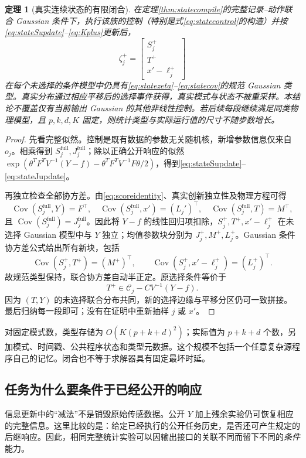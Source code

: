 \documentclass[UTF8,fontset=fandol,zihao=5,a4paper]{ctexart}
\DeclareMathOperator{\Cov}{Cov}\DeclareMathOperator{\im}{im}
\newtheorem{theorem}{定理}[section]
\theoremstyle{definition}
\theoremstyle{remark}\newtheorem{remark}[theorem]{说明}
\numberwithin{equation}{section}
\begin{document}
\begin{theorem}[真实连续状态的有限闭合]
\label{thm:stateclosure}
在定理\ref{thm:statecompile}的完整记录--动作联合 Gaussian 条件下，执行该族的控制（特别是式\eqref{eq:statecontrol}的构造）并按\eqref{eq:stateSupdate}--\eqref{eq:Kplus}更新后，
\[
\zeta_j^+=\begin{bmatrix}S_j^+\\T^+\\x'-\ell_j^+\end{bmatrix}
\]
在每个未选择的条件模型中仍具有\eqref{eq:statezeta}--\eqref{eq:statecov}的规范 Gaussian 类型。真实分布通过相应平移后的选择事件获得，真实模式与状态不被重采样。本结论不覆盖仅有当前输出 Gaussian 的其他非线性控制。若后续每段继续满足同类物理模型，且 $p,k,d,K$ 固定，则统计类型与实际运行值的尺寸不随步数增长。
\end{theorem}
\begin{proof}
先看完整似然。控制是既有数据的参数无关随机核，新增参数信息仅来自 $o_j$。相乘得到 $S_j^{\mathrm{full}},J_j^{\mathrm{full}}$；除以正确公开响应的似然 $\exp(\theta^TF^TV^{-1}(Y-f)-\theta^TF^TV^{-1}F\theta/2)$，得到\eqref{eq:stateSupdate}--\eqref{eq:stateJupdate}。

再独立检查全部协方差。由\eqref{eq:scoreidentity}、真实创新独立性及物理方程可得
\[
\Cov(S_j^{\mathrm{full}},Y)=F^\top,\quad
\Cov(S_j^{\mathrm{full}},x')=(L_j')^\top,\quad
\Cov(S_j^{\mathrm{full}},T)=M^\top,
\]
且 $\Cov(S_j^{\mathrm{full}})=J_j^{\mathrm{full}}$。因此将 $Y-f$ 的线性回归项扣除，$S_j^+,T^+,x'-\ell_j^+$ 在未选择 Gaussian 模型中与 $Y$ 独立；均值参数块分别为 $J_j^+,M^+,L_j^+$。Gaussian 条件协方差公式给出所有新块，包括
\[
\Cov(S_j^+,T^+)=(M^+)^\top,
\qquad\Cov(S_j^+,x'-\ell_j^+)=(L_j^+)^\top.
\]
故规范类型保持，联合协方差自动半正定。原选择条件等价于
\[
T^+\in\mathcal C_j-CV^{-1}(Y-f).
\]
因为 $(T,Y)$ 的未选择联合分布共同，新的选择边缘与平移分区仍可一致拼接。最后归纳每一段即可；没有在证明中重新抽样 $j$ 或 $x'$。
\end{proof}

对固定模式数，类型存储为 $O(K(p+k+d)^2)$；实际值为 $p+k+d$ 个数，另加模式、时间戳、公共程序状态和类型元数据。这个规模不包括一个任意复杂源程序自己的记忆。闭合也不等于求解器具有固定最坏时延。

\subsection{任务为什么要条件于已经公开的响应}
信息更新中的“减法”不是销毁原始传感数据。公开 $Y$ 加上残余实验仍可恢复相应的完整信息。这里比较的是：给定已经执行的公开任务历史，是否还可产生规定的后继响应。因此，相同完整统计实验可以因输出接口的关联不同而留下不同的\emph{条件}能力。
\end{document}
